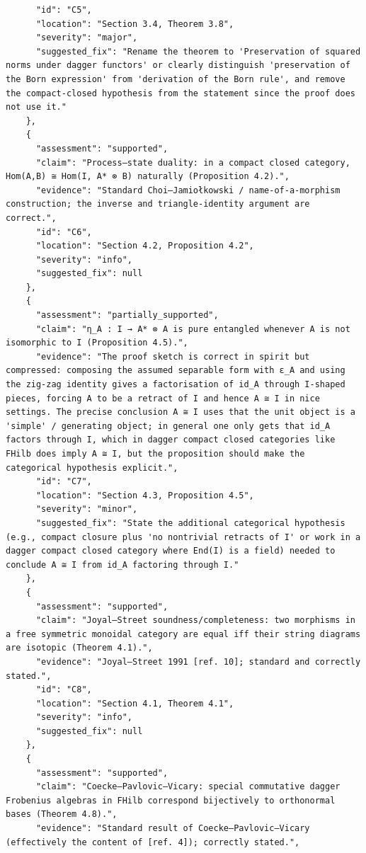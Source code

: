 \documentclass[11pt]{article}
\begin{document}
\begin{verbatim}
      "id": "C5",
      "location": "Section 3.4, Theorem 3.8",
      "severity": "major",
      "suggested_fix": "Rename the theorem to 'Preservation of squared norms under dagger functors' or clearly distinguish 'preservation of the Born expression' from 'derivation of the Born rule', and remove the compact-closed hypothesis from the statement since the proof does not use it."
    },
    {
      "assessment": "supported",
      "claim": "Process–state duality: in a compact closed category, Hom(A,B) ≅ Hom(I, A* ⊗ B) naturally (Proposition 4.2).",
      "evidence": "Standard Choi–Jamiołkowski / name-of-a-morphism construction; the inverse and triangle-identity argument are correct.",
      "id": "C6",
      "location": "Section 4.2, Proposition 4.2",
      "severity": "info",
      "suggested_fix": null
    },
    {
      "assessment": "partially_supported",
      "claim": "η_A : I → A* ⊗ A is pure entangled whenever A is not isomorphic to I (Proposition 4.5).",
      "evidence": "The proof sketch is correct in spirit but compressed: composing the assumed separable form with ε_A and using the zig-zag identity gives a factorisation of id_A through I-shaped pieces, forcing A to be a retract of I and hence A ≅ I in nice settings. The precise conclusion A ≅ I uses that the unit object is a 'simple' / generating object; in general one only gets that id_A factors through I, which in dagger compact closed categories like FHilb does imply A ≅ I, but the proposition should make the categorical hypothesis explicit.",
      "id": "C7",
      "location": "Section 4.3, Proposition 4.5",
      "severity": "minor",
      "suggested_fix": "State the additional categorical hypothesis (e.g., compact closure plus 'no nontrivial retracts of I' or work in a dagger compact closed category where End(I) is a field) needed to conclude A ≅ I from id_A factoring through I."
    },
    {
      "assessment": "supported",
      "claim": "Joyal–Street soundness/completeness: two morphisms in a free symmetric monoidal category are equal iff their string diagrams are isotopic (Theorem 4.1).",
      "evidence": "Joyal–Street 1991 [ref. 10]; standard and correctly stated.",
      "id": "C8",
      "location": "Section 4.1, Theorem 4.1",
      "severity": "info",
      "suggested_fix": null
    },
    {
      "assessment": "supported",
      "claim": "Coecke–Pavlovic–Vicary: special commutative dagger Frobenius algebras in FHilb correspond bijectively to orthonormal bases (Theorem 4.8).",
      "evidence": "Standard result of Coecke–Pavlovic–Vicary (effectively the content of [ref. 4]); correctly stated.",

\end{verbatim}
\end{document}
